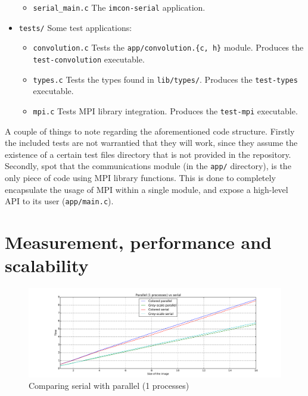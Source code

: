 \documentclass[11pt,a4paper,oneside]{article}
\begin{document}
\begin{itemize}
\begin{itemize}
            \item \texttt{serial\_main.c} The \texttt{imcon-serial}
                application.
        \end{itemize}
    \item \texttt{tests/} Some test applications:
        \begin{itemize}
            \item \texttt{convolution.c} Tests the
                \texttt{app/convolution.\{c, h\}} module. Produces the
                \texttt{test-convolution} executable.
            \item \texttt{types.c} Tests the types found in \texttt{lib/types/}.
                Produces the \texttt{test-types} executable.
            \item \texttt{mpi.c} Tests MPI library integration. Produces the
                \texttt{test-mpi} executable.
        \end{itemize}
\end{itemize}

A couple of things to note regarding the aforementioned code structure. Firstly
the included tests are not warrantied that they will work, since they assume
the existence of a certain test files directory that is not provided in the
repository. Secondly, spot that the communications module (in the \texttt{app/}
directory), is the only piece of code using MPI library functions. This is done
to completely encapsulate the usage of MPI within a single module, and expose
a high-level API to its user (\texttt{app/main.c}).



\section{Measurement, performance and scalability}

\begin{figure}[h]
    \centering
    \includegraphics[width=\textwidth]{comp-1.pdf}
    \caption{Comparing serial with parallel (1 processes)}
\end{figure}
\end{document}
